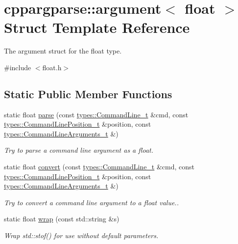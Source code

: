 \hypertarget{structcppargparse_1_1argument_3_01float_01_4}{}\section{cppargparse\+:\+:argument$<$ float $>$ Struct Template Reference}
\label{structcppargparse_1_1argument_3_01float_01_4}


The argument struct for the float type.  




{\ttfamily \#include $<$float.\+h$>$}

\subsection*{Static Public Member Functions}
\begin{DoxyCompactItemize}
\item 
static float \hyperlink{structcppargparse_1_1argument_3_01float_01_4_a5185bf8e191d78341b17be5a4ca6c2f4}{parse} (const \hyperlink{types_8h_a80adf2418b7ce9fe616698efa7533ecf}{types\+::\+Command\+Line\+\_\+t} \&cmd, const \hyperlink{types_8h_a43b4f43f8940de1bf09ced6f1b668053}{types\+::\+Command\+Line\+Position\+\_\+t} \&position, const \hyperlink{types_8h_a003c660afe2ee9c6cc39aea966e8926d}{types\+::\+Command\+Line\+Arguments\+\_\+t} \&)
\begin{DoxyCompactList}\small\item\em Try to parse a command line argument as a float. \end{DoxyCompactList}\item 
static float \hyperlink{structcppargparse_1_1argument_3_01float_01_4_a1597e4ca43d6ea6fe91a99a796d5e5a7}{convert} (const \hyperlink{types_8h_a80adf2418b7ce9fe616698efa7533ecf}{types\+::\+Command\+Line\+\_\+t} \&cmd, const \hyperlink{types_8h_a43b4f43f8940de1bf09ced6f1b668053}{types\+::\+Command\+Line\+Position\+\_\+t} \&position, const \hyperlink{types_8h_a003c660afe2ee9c6cc39aea966e8926d}{types\+::\+Command\+Line\+Arguments\+\_\+t} \&)
\begin{DoxyCompactList}\small\item\em Try to convert a command line argument to a float value.. \end{DoxyCompactList}\item 
static float \hyperlink{structcppargparse_1_1argument_3_01float_01_4_a54f71cdddd612e605b8b997455a4f212}{wrap} (const std\+::string \&s)
\begin{DoxyCompactList}\small\item\em Wrap std\+::stof() for use without default parameters. \end{DoxyCompactList}\end{DoxyCompactItemize}



